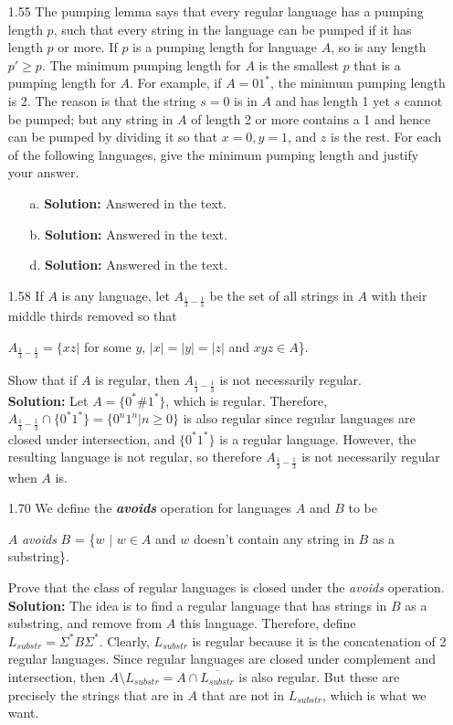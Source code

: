 \begin{enumerate}
\item[1.55]The pumping lemma says that every regular language has a pumping length $p$, such that every string in the language can be pumped if it has length $p$ or more. If $p$ is a pumping length for language $A$, so is any length $p' \ge p$. The minimum pumping length for $A$ is the smallest $p$ that is a pumping length for $A$. For example, if $A = 01^*$, the minimum pumping length is 2. The reason is that the string $s = 0$ is in $A$ and has length 1 yet $s$ cannot be pumped; but any string in $A$ of length 2 or more contains a 1 and hence can be pumped by dividing it so that $x = 0, y = 1$, and $z$ is the rest. For each of the following languages, give the minimum pumping length and justify your answer.
\begin{enumerate}
\item[a.]\textbf{Solution:} Answered in the text.
\item[b.]\textbf{Solution:} Answered in the text.
\item[d.]\textbf{Solution:} Answered in the text.
\end{enumerate}

\item[1.58]If $A$ is any language, let $A_{\frac{1}{3} - \frac{1}{3}}$ be the set of all strings in $A$ with their middle thirds removed so that
\begin{center}
$A_{\frac{1}{3} - \frac{1}{3}} = \{xz |$ for some $y$, $|x| = |y| = |z|$ and $xyz \in A$\}.
\end{center}
Show that if $A$ is regular, then $A_{\frac{1}{3} - \frac{1}{3}}$ is not necessarily regular.
\\
\textbf{Solution:} Let $A = \{0^*\#1^*\}$, which is regular. Therefore, $A_{\frac{1}{3} - \frac{1}{3}} \cap \{0^*1^*\} = \{0^n1^n | n \ge 0\}$ is also regular since regular languages are closed under intersection, and $\{0^*1^*\}$ is a regular language. However, the resulting language is not regular, so therefore $A_{\frac{1}{3} - \frac{1}{3}}$ is not necessarily regular when $A$ is.

\item[1.70]We define the \textbf{\emph{avoids}} operation for languages $A$ and $B$ to be
\begin{center}
$A$ \emph{avoids} $B$ = \{$w$ $|$ $w \in A$ and $w$ doesn't contain any string in $B$ as a substring\}.
\end{center}
Prove that the class of regular languages is closed under the \emph{avoids} operation.
\\
\textbf{Solution:} The idea is to find a regular language that has strings in $B$ as a substring, and remove from $A$ this language. Therefore, define $L_{substr} = \Sigma^*B\Sigma^*$. Clearly, $L_{substr}$ is regular because it is the concatenation of 2 regular languages. Since regular languages are closed under complement and intersection, then $A \setminus L_{substr} = A \cap \overline{L_{substr}}$ is also regular. But these are precisely the strings that are in $A$ that are not in $L_{substr}$, which is what we want.
\end{enumerate}